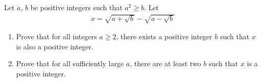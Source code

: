 
Let $a$, $b$ be positive integers such that $a^{2} \ge b$. Let
\begin{align*}
x = \sqrt{a + \sqrt{b}} - \sqrt{a - \sqrt{b}}
\end{align*}
\begin{enumerate}
\item Prove that for all integers $a \ge 2$, there exists a positive integer $b$ such that $x$ is also a positive integer.
\item Prove that for all sufficiently large $a$, there are at least two $b$ such that $x$ is a positive integer. 
\end{enumerate}